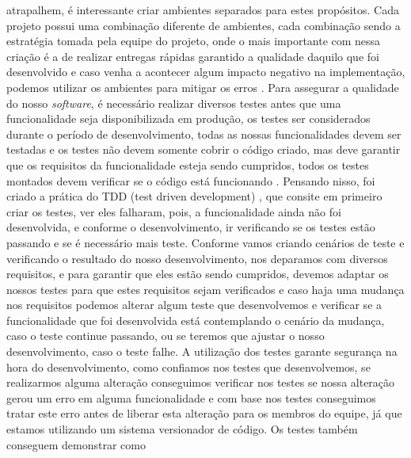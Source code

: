       atrapalhem, é interessante criar ambientes separados para estes propósitos.
      Cada projeto possui uma combinação diferente de ambientes, cada combinação
      sendo a estratégia tomada pela equipe do projeto, onde o mais importante com
      nessa criação é a de realizar entregas rápidas garantido a qualidade daquilo
      que foi desenvolvido e caso venha a acontecer algum impacto negativo na
      implementação, podemos utilizar os ambientes para mitigar os erros
      \cite{TheDevOpsHandbook}. \newline
      Para assegurar a qualidade do nosso \textit{software}, é necessário realizar
      diversos testes antes que uma funcionalidade seja disponibilizada em produção,
      os testes ser considerados durante o período de desenvolvimento,
      todas as nossas funcionalidades devem ser testadas e os testes não devem
      somente cobrir o código criado, mas deve garantir que os requisitos da
      funcionalidade esteja sendo cumpridos, todos os testes montados devem verificar
      se o código está funcionando \cite{CleanCode}. \newline
      Pensando nisso, foi criado a prática do TDD (test driven development)
      \cite{TestDrivenDevelopment}, que consite em primeiro criar os testes, ver
      eles falharam, pois, a funcionalidade ainda não foi desenvolvida, e conforme
      o desenvolvimento, ir verificando se os testes estão passando e se é necessário
      mais teste. Conforme vamos criando cenários de teste e verificando o resultado
      do nosso desenvolvimento, nos deparamos com diversos requisitos, e para
      garantir que eles estão sendo cumpridos, devemos adaptar os nossos testes para
      que estes requisitos sejam verificados e caso haja uma mudança nos requisitos
      podemos alterar algum teste que desenvolvemos e verificar se a funcionalidade
      que foi desenvolvida está contemplando o cenário da mudança, caso o teste
      continue passando, ou se teremos que ajustar o nosso desenvolvimento, caso o
      teste falhe. \newline
      A utilização dos testes garante segurança na hora do desenvolvimento,
      como confiamos nos testes que desenvolvemos, se realizarmos alguma alteração
      conseguimos verificar nos testes se nossa alteração gerou um erro em alguma
      funcionalidade e com base nos testes conseguimos tratar este erro antes de
      liberar esta alteração para os membros do equipe, já que estamos utilizando um
      sistema versionador de código. Os testes também conseguem demonstrar como
